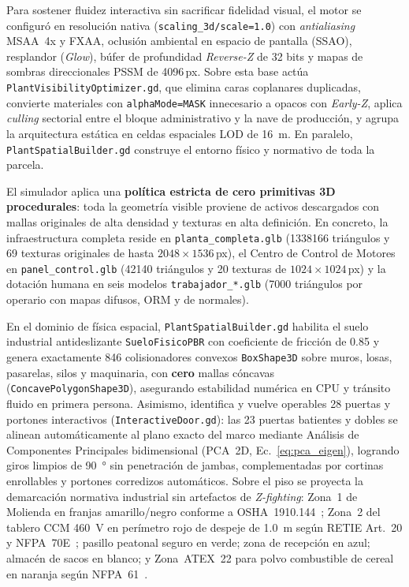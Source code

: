 Para sostener fluidez interactiva sin sacrificar fidelidad visual, el motor se configuró en resolución nativa (\texttt{scaling\_3d/scale=1.0}) con \emph{antialiasing} MSAA~4x y FXAA, oclusión ambiental en espacio de pantalla (SSAO), resplandor (\emph{Glow}), búfer de profundidad \emph{Reverse-Z} de \num{32} bits y mapas de sombras direccionales PSSM de \num{4096}\,px. Sobre esta base actúa \texttt{Plant\allowbreak Visibility\allowbreak Optimizer.gd}, que elimina caras coplanares duplicadas, convierte materiales con \texttt{alphaMode=MASK} innecesario a opacos con \emph{Early-Z}, aplica \emph{culling} sectorial entre el bloque administrativo y la nave de producción, y agrupa la arquitectura estática en celdas espaciales LOD de \qty{16}{\meter}. En paralelo, \texttt{Plant\allowbreak Spatial\allowbreak Builder.gd} construye el entorno físico y normativo de toda la parcela.

El simulador aplica una \textbf{política estricta de cero primitivas 3D procedurales}: toda la geometría visible proviene de activos descargados con mallas originales de alta densidad y texturas en alta definición. En concreto, la infraestructura completa reside en \texttt{planta\_\allowbreak completa.glb} (\num{1338166} triángulos y \num{69} texturas originales de hasta $2048\times 1536$\,px), el Centro de Control de Motores en \texttt{panel\_\allowbreak control.glb} (\num{42140} triángulos y \num{20} texturas de $1024\times 1024$\,px) y la dotación humana en seis modelos \texttt{trabajador\_*.glb} (\num{7000} triángulos por operario con mapas difusos, ORM y de normales).

En el dominio de física espacial, \texttt{Plant\allowbreak Spatial\allowbreak Builder.gd} habilita el suelo industrial antideslizante \texttt{Suelo\allowbreak FisicoPBR} con coeficiente de fricción de \num{0.85} y genera exactamente \num{846} colisionadores convexos \texttt{Box\allowbreak Shape3D} sobre muros, losas, pasarelas, silos y maquinaria, con \textbf{cero} mallas cóncavas (\texttt{Concave\allowbreak Polygon\allowbreak Shape3D}), asegurando estabilidad numérica en CPU y tránsito fluido en primera persona. Asimismo, identifica y vuelve operables \num{28} puertas y portones interactivos (\texttt{Interactive\allowbreak Door.gd}): las \num{23} puertas batientes y dobles se alinean automáticamente al plano exacto del marco mediante Análisis de Componentes Principales bidimensional (PCA~2D, Ec.~\eqref{eq:pca_eigen}), logrando giros limpios de \qty{90}{\degree} sin penetración de jambas, complementadas por cortinas enrollables y portones corredizos automáticos. Sobre el piso se proyecta la demarcación normativa industrial sin artefactos de \emph{Z-fighting}: Zona~1 de Molienda en franjas amarillo/negro conforme a OSHA~1910.144~\cite{OSHA1910}; Zona~2 del tablero CCM \qty{460}{\volt} en perímetro rojo de despeje de \qty{1.0}{\meter} según RETIE Art.~20 y NFPA~70E~\cite{RETIE2026,NFPA70E}; pasillo peatonal seguro en verde; zona de recepción en azul; almacén de sacos en blanco; y Zona~ATEX~22 para polvo combustible de cereal en naranja según NFPA~61~\cite{NFPA61}.

